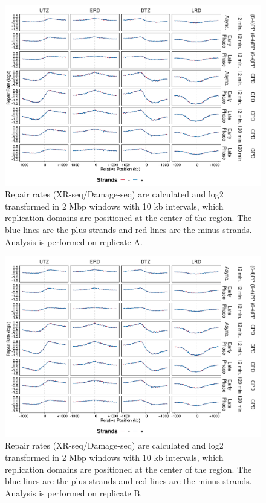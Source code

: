 \begin{figure}[H]
\begin{center}
\includegraphics[width=\textwidth]{Chapters/7_appendix/figures/supfig22}
\caption[Repair rates of replication domains in 2 Mbp (replicate A).]{Repair rates (XR-seq/Damage-seq) are calculated and log2 transformed in 2 Mbp windows with 10 kb intervals, which replication domains are positioned at the center of the region. The blue lines are the plus strands and red lines are the minus strands. Analysis is performed on replicate A.}
\label{supfig:repairrate2000repdomainA}
\end{center}
\end{figure}

\begin{figure}[H]
\begin{center}
\includegraphics[width=\textwidth]{Chapters/7_appendix/figures/supfig23}
\caption[Repair rates of replication domains in 2 Mbp (replicate B).]{Repair rates (XR-seq/Damage-seq) are calculated and log2 transformed in 2 Mbp windows with 10 kb intervals, which replication domains are positioned at the center of the region. The blue lines are the plus strands and red lines are the minus strands. Analysis is performed on replicate B.}
\label{supfig:repairrate2000repdomainB}
\end{center}
\end{figure}

